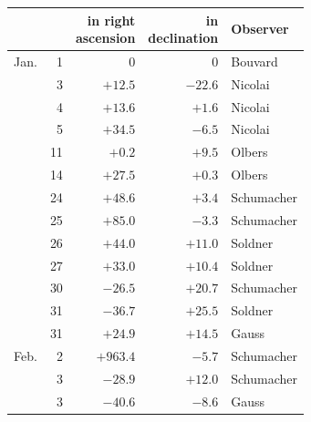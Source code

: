 \begin{center}
\begin{tabular}{lr|r|r|l}
 & & \shortstack{in right\\ascension} & \shortstack{in\\declination} & Observer \\
\hline
Jan. & 1 & 0 & 0 & Bouvard \\
 & 3 & $+12.5$ & $-22.6$ & Nicolai \\
 & 4 & $+13.6$ & $+1.6$ & Nicolai \\
 & 5 & $+34.5$ & $-6.5$ & Nicolai \\
 & 11 & $+0.2$ & $+9.5$ & Olbers \\
 & 14 & $+27.5$ & $+0.3$ & Olbers \\
 & 24 & $+48.6$ & $+3.4$ & Schumacher \\
 & 25 & $+85.0$ & $-3.3$ & Schumacher \\
 & 26 & $+44.0$ & $+11.0$ & Soldner \\
 & 27 & $+33.0$ & $+10.4$ & Soldner \\
 & 30 & $-26.5$ & $+20.7$ & Schumacher \\
 & 31 & $-36.7$ & $+25.5$ & Soldner \\
 & 31 & $+24.9$ & $+14.5$ & Gauss \\
Feb. & 2 & $+963.4$ & $-5.7$ & Schumacher \\
 & 3 & $-28.9$ & $+12.0$ & Schumacher \\
 & 3 & $-40.6$ & $-8.6$ & Gauss \\
\end{tabular}
\end{center}


